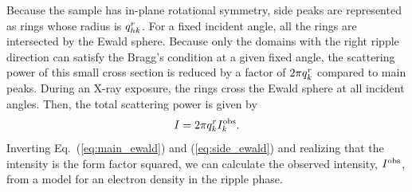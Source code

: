 Because the sample has in-plane rotational symmetry, side peaks are represented as
rings whose radius is $q_{hk}^r$. For a fixed incident
angle, all the rings are intersected by the Ewald sphere. Because only the domains
with the right ripple direction can satisfy the Bragg's condition at a given fixed
angle, the scattering power of this small cross section is reduced by 
a factor of $2\pi q_{k}^r$ compared to main peaks. During 
an X-ray exposure, the rings cross the Ewald sphere
at all incident angles. Then, the total scattering power is given by
\begin{equation}
  I=2\pi q_{k}^r I_{k}^\mathrm{obs}. \label{eq:side_ewald}
\end{equation}
Inverting Eq.~(\ref{eq:main_ewald}) and (\ref{eq:side_ewald}) 
and realizing that the intensity is the form factor
squared, we can calculate the observed intensity, $I_{}^\mathrm{obs}$, 
from a model for an electron density in the ripple phase.
